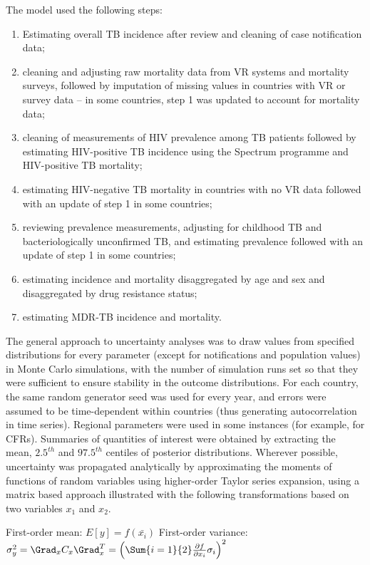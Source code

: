 The model used  the following steps: 

\begin{enumerate}
\item Estimating overall TB incidence after review and cleaning of case notification data;
\item cleaning and adjusting raw mortality data from VR systems and mortality surveys, followed by imputation of missing values in countries with VR or survey data – in some countries, step 1 was updated to account for mortality data;
\item cleaning of measurements of HIV prevalence among TB patients followed by estimating HIV-positive TB incidence using the Spectrum programme and HIV-positive TB mortality;
\item estimating HIV-negative TB mortality in countries with no VR data followed with an update of step 1 in some countries; 
\item reviewing prevalence measurements, adjusting for childhood TB and bacteriologically unconfirmed TB,  and estimating prevalence followed with an update of step 1 in some countries; 
\item estimating incidence and mortality disaggregated by age and sex and disaggregated by drug resistance status;
\item estimating MDR-TB incidence and mortality.
\end{enumerate}

The general approach to uncertainty analyses was to draw values from specified distributions for every parameter (except for notifications and population values) in Monte Carlo simulations, with the number of simulation runs set so that they were sufficient to ensure stability in the outcome distributions. For each country, the same random generator seed was used for every year, and errors were assumed to be time-dependent within countries (thus generating autocorrelation in time series). Regional parameters were used in some instances (for example, for CFRs). Summaries of quantities of interest were obtained by extracting the mean, $2.5^{th}$ and $97.5^{th}$ centiles of posterior distributions. Wherever possible, uncertainty was propagated analytically by approximating the moments of functions of random variables using higher-order Taylor series expansion\cite{Ku_1966}, using a matrix based approach\cite{Lab1998-dy} illustrated with the following transformations based on two variables $x_1$ and $x_2$.

First-order mean: $E[y] = f(\bar{x_i})$
First-order variance: $\sigma^2_y=\Grad_x C_x \Grad^T_x=\left(\Sum{i=1}{2}\frac{\partial{f}}{\partial{x_i}}\sigma_i\right)^2$




